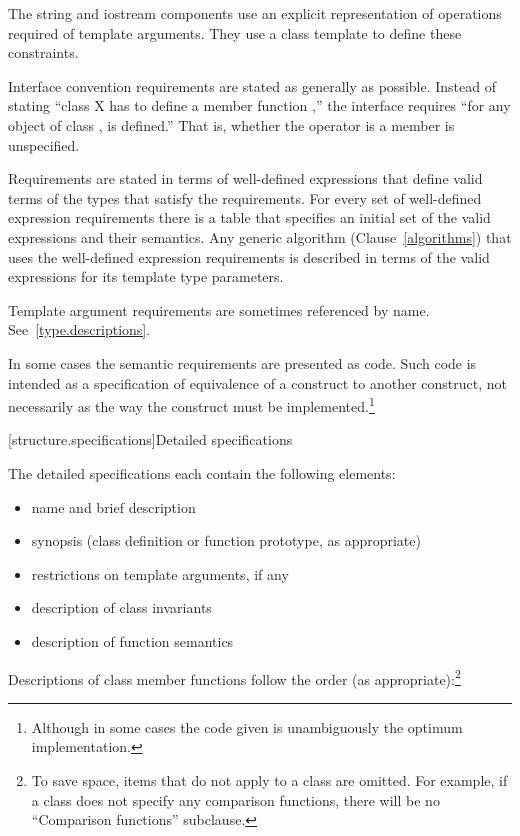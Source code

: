 \pnum
The string and iostream components use an explicit representation of operations
required of template arguments. They use a class template  to
define these constraints.

\pnum
Interface convention requirements are stated as generally as possible. Instead
of stating ``class X has to define a member function ,'' the
interface requires ``for any object  of class ,  is
defined.'' That is, whether the operator is a member is unspecified.

\pnum
Requirements are stated in terms of well-defined expressions that define valid terms of
the types that satisfy the requirements. For every set of well-defined expression
requirements there is a table that specifies an initial set of the valid expressions and
their semantics. Any generic algorithm (Clause~\ref{algorithms}) that uses the
well-defined expression requirements is described in terms of the valid expressions for
its template type parameters.

\pnum
Template argument requirements are sometimes referenced by name.
See~\ref{type.descriptions}.

\pnum
In some cases the semantic requirements are presented as \Cpp code.
Such code is intended as a
specification of equivalence of a construct to another construct, not
necessarily as the way the construct
must be implemented.\footnote{Although in some cases the code given is
unambiguously the optimum implementation.}

[structure.specifications]{Detailed specifications}

\pnum
The detailed specifications each contain the following elements:%

\begin{itemize}
\item name and brief description
\item synopsis (class definition or function prototype, as appropriate)
\item restrictions on template arguments, if any
\item description of class invariants
\item description of function semantics
\end{itemize}

\pnum
Descriptions of class member functions follow the order (as
appropriate):\footnote{To save space, items that do not apply to a class are omitted.
For example, if a class does not specify any comparison functions, there
will be no ``Comparison functions'' subclause.}

